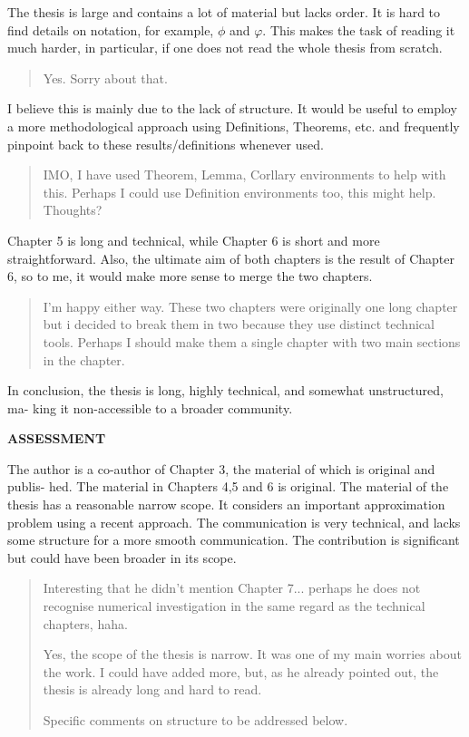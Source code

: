 \documentclass[a4paper]{article}
\begin{document}
The thesis is large and contains a lot of material but lacks order. It is hard to find
details on notation, for example, \(\phi\) and \(\varphi\). This makes the task of reading it much
harder, in particular, if one does not read the whole thesis from scratch.
\begin{quote}
    Yes. Sorry about that. 
\end{quote}

I believe this is mainly due to the lack of structure. It would be useful to employ
a more methodological approach using Definitions, Theorems, etc. and frequently
pinpoint back to these results/definitions whenever used.
\begin{quote}
    IMO, I have used Theorem, Lemma, Corllary environments to help with this. Perhaps I could use Definition environments too, this might help. Thoughts? 
\end{quote}

Chapter 5 is long and technical, while Chapter 6 is short and more straightforward.
Also, the ultimate aim of both chapters is the result of Chapter 6, so to me, it would
make more sense to merge the two chapters.
\begin{quote}
    I'm happy either way. These two chapters were originally one long chapter but i decided to break them in two because they use distinct technical tools. Perhaps I should make them a single chapter with two main sections in the chapter.
\end{quote}

In conclusion, the thesis is long, highly technical, and somewhat unstructured, ma-
king it non-accessible to a broader community.

\textbf{ASSESSMENT}

The author is a co-author of Chapter 3, the material of which is original and publis-
hed. The material in Chapters 4,5 and 6 is original. The material of the thesis has a
reasonable narrow scope. It considers an important approximation problem using a
recent approach. The communication is very technical, and lacks some structure for
a more smooth communication. The contribution is significant but could have been
broader in its scope.
\begin{quote}
    Interesting that he didn't mention Chapter 7... perhaps he does not recognise numerical investigation in the same regard as the technical chapters, haha. 

    Yes, the scope of the thesis is narrow. It was one of my main worries about the work. I could have added more, but, as he already pointed out, the thesis is already long and hard to read. 

    Specific comments on structure to be addressed below. 
\end{quote}
\end{document}
